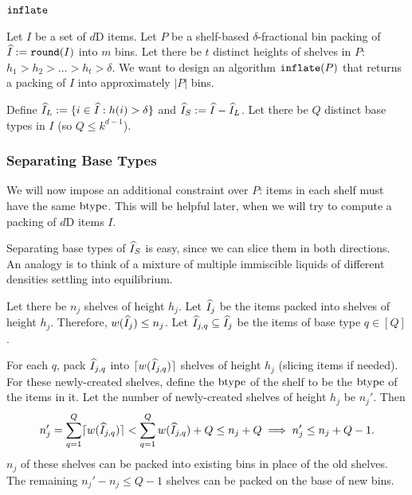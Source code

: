 \subsection{\texorpdfstring{$\operatorname{\mathtt{inflate}}$}{inflate}}
\label{sec:hgap:inflate}

Let $I$ be a set of $d$D items. Let $P$ be a shelf-based $\delta$-fractional
bin packing of $\widehat{I} := \operatorname{\mathtt{round}}(I)$ into $m$ bins.
Let there be $t$ distinct heights of shelves in $P$: $h_1 > h_2 > \ldots > h_t > \delta$.
We want to design an algorithm $\operatorname{\mathtt{inflate}}(P)$ that returns a packing
of $I$ into approximately $|P|$ bins.

Define $\widehat{I}_L := \{i \in \widehat{I}: h(i) > \delta\}$ and $\widehat{I}_S := \widehat{I} - \widehat{I}_L$.
Let there be $Q$ distinct base types in $I$ (so $Q \le k^{d-1}$).

\subsubsection{Separating Base Types}
\label{sec:hgap:sep-btype}

We will now impose an additional constraint over $P$:
items in each shelf must have the same $\operatorname{btype}$.
This will be helpful later, when we will try to compute a packing of $d$D items $I$.

Separating base types of $\widehat{I}_S$ is easy, since we can slice them
in both directions. An analogy is to think of a mixture of
multiple immiscible liquids of different densities settling into equilibrium.

\begin{comment}
\begin{figure}[!ht]
\centering

\caption{Separating base types of $\Khat_S$ in a bin.
This example has 3 different base types in $\Khat_S$.}
\label{fig:split-base-small}
\end{figure}
\end{comment}

Let there be $n_j$ shelves of height $h_j$.
Let $\widehat{I}_j$ be the items packed into shelves of height $h_j$.
Therefore, $w(\widehat{I}_j) \le n_j$.
Let $\widehat{I}_{j,q} \subseteq \widehat{I}_j$ be the items of base type $q \in [Q]$.

For each $q$, pack $\widehat{I}_{j,q}$ into $\lceil w(\widehat{I}_{j,q}) \rceil$ shelves of height $h_j$
(slicing items if needed). For these newly-created shelves, define the $\operatorname{btype}$
of the shelf to be the $\operatorname{btype}$ of the items in it.
Let the number of newly-created shelves of height $h_j$ be $n_j'$. Then
\[ n_j' = \sum_{q=1}^Q \lceil w(\widehat{I}_{j,q}) \rceil
< \sum_{q=1}^Q w(\widehat{I}_{j,q}) + Q
\le n_j + Q \implies n_j' \le n_j + Q - 1. \]
$n_j$ of these shelves can be packed into existing bins in place of the old shelves.
The remaining $n_j' - n_j \le Q-1$ shelves can be packed on the base of new bins.

